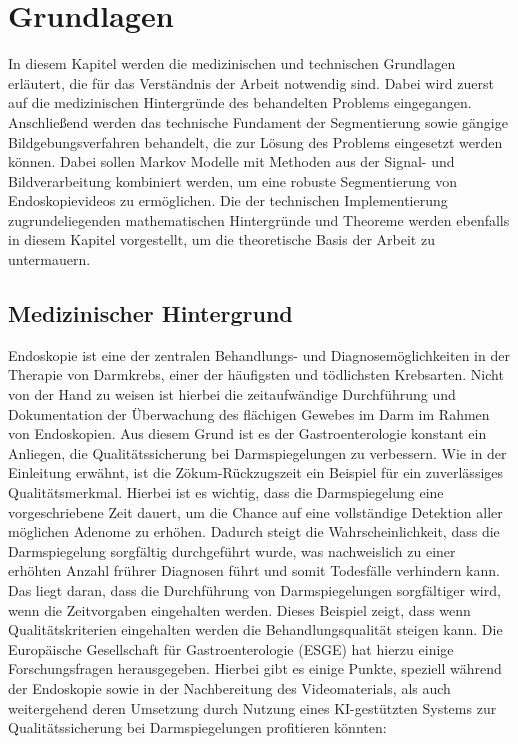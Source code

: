 \chapter{Grundlagen}\label{ch:preliminaries}

In diesem Kapitel werden die medizinischen und technischen Grundlagen erläutert, die für das Verständnis der Arbeit notwendig sind.
Dabei wird zuerst auf die medizinischen Hintergründe des behandelten Problems eingegangen.
Anschließend werden das technische Fundament der Segmentierung sowie gängige Bildgebungsverfahren behandelt, die zur Lösung des Problems eingesetzt werden können.
Dabei sollen Markov Modelle mit Methoden aus der Signal- und Bildverarbeitung kombiniert werden, um eine robuste Segmentierung von Endoskopievideos zu ermöglichen.
Die der technischen Implementierung zugrundeliegenden mathematischen Hintergründe und Theoreme werden ebenfalls in diesem Kapitel vorgestellt, um die theoretische Basis der Arbeit zu untermauern.

\section{Medizinischer Hintergrund}
Endoskopie ist eine der zentralen Behandlungs- und Diagnosemöglichkeiten in der Therapie von Darmkrebs, 
einer der häufigsten und tödlichsten Krebsarten.\citep{labianca2010-colon-cancer}\footnotemark{} 
Nicht von der Hand zu weisen ist hierbei die zeitaufwändige Durchführung und 
Dokumentation der Überwachung des flächigen Gewebes im Darm im Rahmen von Endoskopien. Aus diesem Grund ist es 
der Gastroenterologie konstant ein Anliegen, die Qualitätssicherung bei Darmspiegelungen zu verbessern. 
Wie in der Einleitung erwähnt, ist die Zökum-Rückzugszeit ein Beispiel für ein zuverlässiges Qualitätsmerkmal.  Hierbei ist es wichtig, dass die Darmspiegelung eine vorgeschriebene Zeit dauert, um die Chance auf eine vollständige Detektion aller möglichen Adenome zu erhöhen. 
Dadurch steigt die Wahrscheinlichkeit, dass die Darmspiegelung sorgfältig durchgeführt wurde, was nachweislich zu einer 
erhöhten Anzahl frührer Diagnosen führt und somit Todesfälle verhindern kann. Das liegt daran, dass die Durchführung von Darmspiegelungen sorgfältiger wird, wenn 
die Zeitvorgaben eingehalten werden.
Dieses Beispiel zeigt, dass wenn Qualitätskriterien eingehalten werden die Behandlungsqualität steigen kann. 
Die Europäische Gesellschaft für Gastroenterologie (ESGE) hat hierzu einige Forschungsfragen herausgegeben. Hierbei gibt es einige Punkte, speziell während der Endoskopie sowie in der Nachbereitung des Videomaterials, als auch weitergehend deren Umsetzung durch Nutzung eines KI-gestützten Systems zur Qualitätssicherung bei Darmspiegelungen profitieren könnten:

